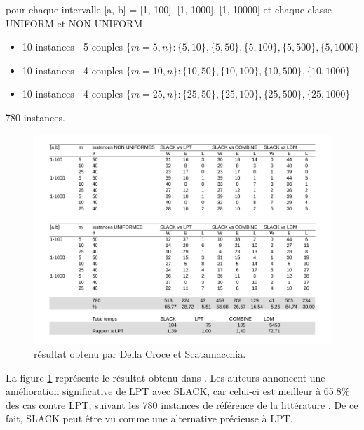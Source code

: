 \documentclass[a4paper,12pt]{report}
\theoremstyle{plain}				%
\theoremstyle{definition}				%
\begin{document}
pour chaque intervalle [a, b] = [1, 100], [1, 1000], [1, 10000] et
  chaque classe UNIFORM et NON-UNIFORM 
\begin{itemize}
\item 10 instances $\cdot$ 5 couples $\{m=5,n\}:\{5,10\},\{5,50\},\{5,100\},\{5,500\},\{5,1000\}$
\item 10 instances $\cdot$ 4 couples $\{m=10, n\}:\{10,50\},\{10,100\},\{10,500\},\{10,1000\}$
\item 10 instances $\cdot$ 4 couples $\{m=25,n\}:\{25,50\},\{25,100\},\{25,500\},\{25,1000\}$
\end{itemize}  

780 instances.

\begin{figure}
{\centering
\includegraphics[width=\columnwidth]{1_Resultat_De_DCS.pdf}
\caption{résultat obtenu par Della Croce et Scatamacchia.}
\label{fig:resultatDellaCroceScatamacchia}
\par}
\end{figure}

La figure \ref{fig:resultatDellaCroceScatamacchia} représente le résultat obtenu 
  dans \cite{della2020longest}. 
Les auteurs annoncent une amélioration significative de LPT avec SLACK, 
  car celui-ci est meilleur à 65.8\% des cas contre LPT, suivant les 780 instances 
  de référence de la littérature \cite{della2020longest}. De ce fait, SLACK peut être vu comme une alternative précieuse à LPT.
  
\end{document}
